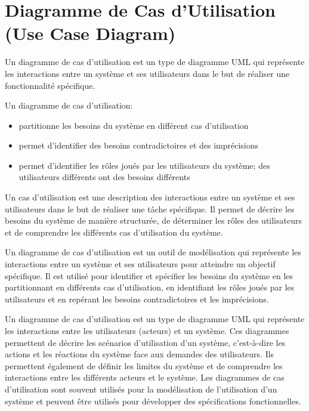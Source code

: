 \newpage
\section{Diagramme de Cas d'Utilisation (Use Case Diagram)}\label{sec:diagrammecasutilisation}
\begin{definition}
Un diagramme de cas d'utilisation est un type de diagramme UML qui représente les interactions entre un système et ses utilisateurs dans le but de réaliser une fonctionnalité spécifique.

Un diagramme de cas d’utilisation:
\begin{itemize}
\item partitionne les besoins du système en différent cas d’utilisation
\item permet d’identifier des besoins contradictoires et des
imprécisions
\item permet d’identifier les rôles joués par les utilisateurs du
système; des utilisateurs différents ont des besoins différents
\end{itemize}

Un cas d'utilisation est une description des interactions entre un système et ses utilisateurs dans le but de réaliser une tâche spécifique. Il permet de décrire les besoins du système de manière structurée, de déterminer les rôles des utilisateurs et de comprendre les différents cas d'utilisation du système.



Un diagramme de cas d'utilisation est un outil de modélisation qui représente les interactions entre un système et ses utilisateurs pour atteindre un objectif spécifique. Il est utilisé pour identifier et spécifier les besoins du système en les partitionnant en différents cas d'utilisation, en identifiant les rôles joués par les utilisateurs et en repérant les besoins contradictoires et les imprécisions.

Un diagramme de cas d'utilisation est un type de diagramme UML qui représente les interactions entre les utilisateurs (acteurs) et un système. Ces diagrammes permettent de décrire les scénarios d'utilisation d'un système, c'est-à-dire les actions et les réactions du système face aux demandes des utilisateurs. Ils permettent également de définir les limites du système et de comprendre les interactions entre les différents acteurs et le système. Les diagrammes de cas d'utilisation sont souvent utilisés pour la modélisation de l'utilisation d'un système et peuvent être utilisés pour développer des spécifications fonctionnelles.
\end{definition}
